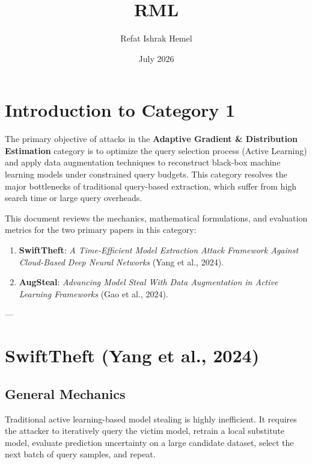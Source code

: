 \documentclass{article}
\title{RML}
\author{Refat Ishrak Hemel}
\date{July 2026}
\begin{document}
\maketitle

\section{Introduction to Category 1}
The primary objective of attacks in the \textbf{Adaptive Gradient \& Distribution Estimation} category is to optimize the query selection process (Active Learning) and apply data augmentation techniques to reconstruct black-box machine learning models under constrained query budgets. This category resolves the major bottlenecks of traditional query-based extraction, which suffer from high search time or large query overheads.

This document reviews the mechanics, mathematical formulations, and evaluation metrics for the two primary papers in this category:
\begin{enumerate}
    \item \textbf{SwiftTheft}: \textit{A Time-Efficient Model Extraction Attack Framework Against Cloud-Based Deep Neural Networks} (Yang et al., 2024).
    \item \textbf{AugSteal}: \textit{Advancing Model Steal With Data Augmentation in Active Learning Frameworks} (Gao et al., 2024).
\end{enumerate}

---

\section{SwiftTheft (Yang et al., 2024)}

\subsection{General Mechanics}
Traditional active learning-based model stealing is highly inefficient. It requires the attacker to iteratively query the victim model, retrain a local substitute model, evaluate prediction uncertainty on a large candidate dataset, select the next batch of query samples, and repeat. 
\end{document}
